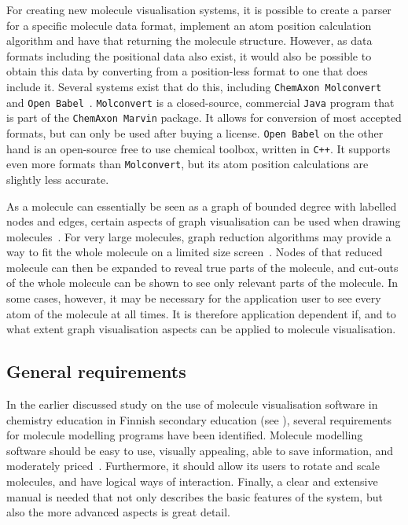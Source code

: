 For creating new molecule visualisation systems, it is possible to create a parser for a specific molecule data format, implement an atom position calculation algorithm and have that returning the molecule structure. However, as data formats including the positional data also exist, it would also be possible to obtain this data by converting from a position-less format to one that does include it. Several systems exist that do this, including \verb|ChemAxon Molconvert|~\cite{chemaxon2014molecule} and \verb|Open Babel|~\cite{oboyle2011open}. \verb|Molconvert| is a closed-source, commercial \verb|Java| program that is part of the \verb|ChemAxon Marvin| package. It allows for conversion of most accepted formats, but can only be used after buying a license. \verb|Open Babel| on the other hand is an open-source free to use chemical toolbox, written in \verb|C++|. It supports even more formats than \verb|Molconvert|, but its atom position calculations are slightly less accurate.

As a molecule can essentially be seen as a graph of bounded degree with labelled nodes and edges, certain aspects of graph visualisation can be used when drawing molecules~\cite{boissonnat2001structure}. For very large molecules, graph reduction algorithms may provide a way to fit the whole molecule on a limited size screen~\cite{batagelj2004pajek}. Nodes of that reduced molecule can then be expanded to reveal true parts of the molecule, and cut-outs of the whole molecule can be shown to see only relevant parts of the molecule. In some cases, however, it may be necessary for the application user to see every atom of the molecule at all times. It is therefore application dependent if, and to what extent graph visualisation aspects can be applied to molecule visualisation.

\subsection{General requirements}
In the earlier discussed study on the use of molecule visualisation software in chemistry education in Finnish secondary education (see ), several requirements for molecule modelling programs have been identified. Molecule modelling software should be easy to use, visually appealing, able to save information, and moderately priced~\cite{aksela2008computer}. Furthermore, it should allow its users to rotate and scale molecules, and have logical ways of interaction. Finally, a clear and extensive manual is needed that not only describes the basic features of the system, but also the more advanced aspects is great detail.

